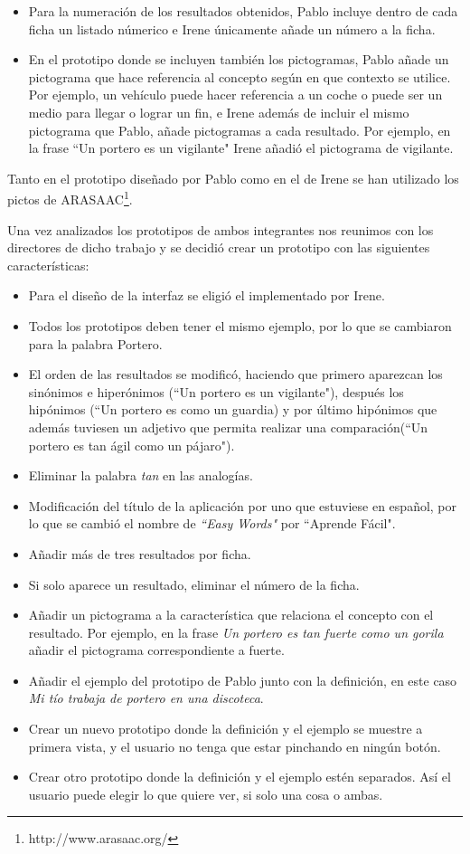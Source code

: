\begin{itemize}
	\item Para la numeración de los resultados obtenidos, Pablo incluye dentro de cada ficha un listado númerico e Irene únicamente añade un número a la ficha.
	\item En el prototipo donde se incluyen también los pictogramas, Pablo añade un pictograma que hace referencia al concepto según en que contexto se utilice. Por ejemplo, un vehículo puede hacer referencia a un coche o puede ser un medio para llegar o lograr un fin, e Irene además de incluir el mismo pictograma que Pablo, añade pictogramas a cada resultado. Por ejemplo, en la frase ``Un portero es un vigilante" Irene añadió el pictograma de vigilante.
\end{itemize}

Tanto en el prototipo diseñado por Pablo como en el de Irene se han utilizado los pictos de ARASAAC\footnote{http://www.arasaac.org/}.

Una vez analizados los prototipos de ambos integrantes nos reunimos con los directores de dicho trabajo y se decidió crear un prototipo con las siguientes características:


\begin{itemize}
	\item Para el diseño de la interfaz se eligió el implementado por Irene.
	\item Todos los prototipos deben tener el mismo ejemplo, por lo que se cambiaron para la palabra Portero.
	\item El orden de las resultados se modificó, haciendo que primero aparezcan los sinónimos e hiperónimos (``Un portero es un vigilante"), después los hipónimos (``Un portero es como un guardia) y por último hipónimos que además tuviesen un adjetivo que permita realizar una comparación(``Un portero es tan ágil como un pájaro").
	\item Eliminar la palabra \textit{tan} en las analogías.
	\item Modificación del título de la aplicación por uno que estuviese en español, por lo que se cambió el nombre de \textit{``Easy Words"} por ``Aprende Fácil".
	\item Añadir más de tres resultados por ficha.
	\item Si solo aparece un resultado, eliminar el número de la ficha.
	\item Añadir un pictograma a la característica que relaciona el concepto con el resultado. Por ejemplo, en la frase \textit{Un portero es tan fuerte como un gorila} añadir el pictograma correspondiente a fuerte.
	\item Añadir el ejemplo del prototipo de Pablo junto con la definición, en este caso \textit{Mi tío trabaja de portero en una discoteca}.
	\item Crear un nuevo prototipo donde la definición y el ejemplo se muestre a primera vista, y el usuario no tenga que estar pinchando en ningún botón.
	\item Crear otro prototipo donde la definición y el ejemplo estén separados. Así el usuario puede elegir lo que quiere ver, si solo una cosa o ambas.
\end{itemize} 

